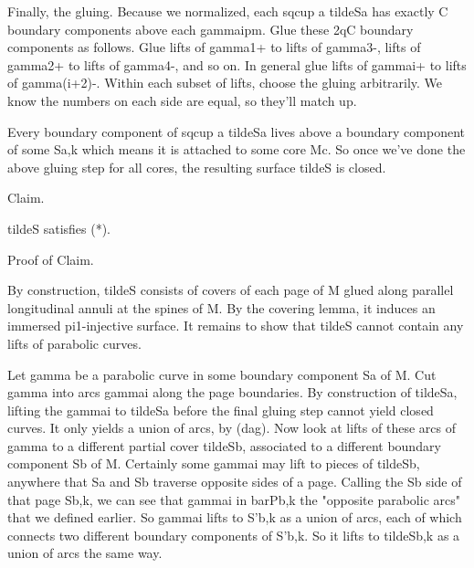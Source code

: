 \documentclass[12pt]{amsart}
\theoremstyle{definition}
\theoremstyle{remark}
\begin{document}
Finally, the gluing. Because we normalized, each sqcup a tildeSa has exactly
C boundary components above each gammaipm.  Glue these 2qC boundary components
as follows. Glue lifts of gamma1+ to lifts of gamma3-, lifts of gamma2+ to
lifts of gamma4-, and so on. In general glue lifts of gammai+ to lifts of
gamma(i+2)-. Within each subset of lifts, choose the gluing arbitrarily. We
know the numbers on each side are equal, so they'll match up.

Every boundary component of sqcup a tildeSa lives above a boundary component of
some Sa,k which means it is attached to some core Mc. So once we've done the
above gluing step for all cores, the resulting surface tildeS is closed.

Claim.

tildeS satisfies (*).

Proof of Claim.

By construction, tildeS consists of covers of each page of M glued along
parallel longitudinal annuli at the spines of M. By the covering lemma, it
induces an immersed pi1-injective surface. It remains to show that tildeS
cannot contain any lifts of parabolic curves.

Let gamma be a parabolic curve in some boundary component Sa of M. Cut gamma
into arcs gammai along the page boundaries. By construction of tildeSa, lifting
the gammai to tildeSa before the final gluing step cannot yield closed curves.
It only yields a union of arcs, by (dag). Now look at lifts of these arcs of
gamma to a different partial cover tildeSb, associated to a different boundary
component Sb of M. Certainly some gammai may lift to pieces of tildeSb,
anywhere that Sa and Sb traverse opposite sides of a page. Calling the Sb side
of that page Sb,k, we can see that gammai in barPb,k the "opposite parabolic
arcs" that we defined earlier. So gammai lifts to S'b,k as a union of arcs,
each of which connects two different boundary components of S'b,k. So it lifts
to tildeSb,k as a union of arcs the same way.
\end{document}

